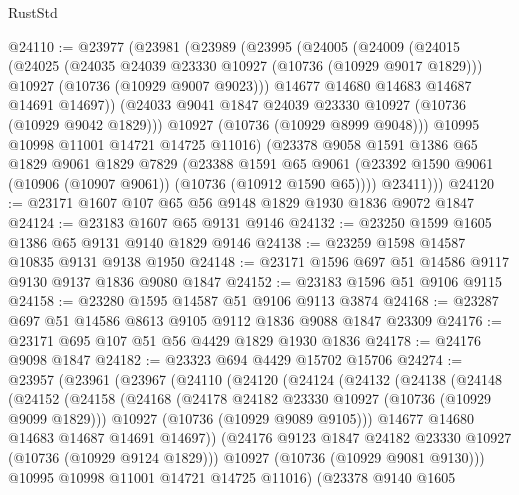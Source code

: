 \begin{lexlean}{RustStd}
\begin{coremodule}
@24110 := @23977
    (@23981
      (@23989
        (@23995
          (@24005
            (@24009
              (@24015
                (@24025
                  (@24035 @24039 @23330 @10927 (@10736 (@10929 @9017 @1829)))
                  @10927
                  (@10736 (@10929 @9007 @9023)))
                @14677
                @14680
                @14683
                @14687
                @14691
                @14697))
            (@24033 @9041 @1847 @24039 @23330 @10927 (@10736 (@10929 @9042 @1829)))
            @10927
            (@10736 (@10929 @8999 @9048)))
          @10995
          @10998
          @11001
          @14721
          @14725
          @11016)
        (@23378
          @9058
          @1591
          @1386
          @65
          @1829
          @9061
          @1829
          @7829
          (@23388
            @1591
            @65
            @9061
            (@23392 @1590 @9061 (@10906 (@10907 @9061)) (@10736 (@10912 @1590 @65))))
          @23411)))
@24120 := @23171 @1607 @107 @65 @56 @9148 @1829 @1930 @1836 @9072 @1847
@24124 := @23183 @1607 @65 @9131 @9146
@24132 := @23250 @1599 @1605 @1386 @65 @9131 @9140 @1829 @9146
@24138 := @23259 @1598 @14587 @10835 @9131 @9138 @1950
@24148 := @23171 @1596 @697 @51 @14586 @9117 @9130 @9137 @1836 @9080 @1847
@24152 := @23183 @1596 @51 @9106 @9115
@24158 := @23280 @1595 @14587 @51 @9106 @9113 @3874
@24168 := @23287 @697 @51 @14586 @8613 @9105 @9112 @1836 @9088 @1847 @23309
@24176 := @23171 @695 @107 @51 @56 @4429 @1829 @1930 @1836
@24178 := @24176 @9098 @1847
@24182 := @23323 @694 @4429 @15702 @15706
@24274 := @23957
    (@23961
      (@23967
        (@24110
          (@24120
            (@24124
              (@24132
                (@24138
                  (@24148
                    (@24152
                      (@24158
                        (@24168
                          (@24178 @24182 @23330 @10927 (@10736 (@10929 @9099 @1829)))
                          @10927
                          (@10736 (@10929 @9089 @9105)))
                        @14677
                        @14680
                        @14683
                        @14687
                        @14691
                        @14697))
                    (@24176 @9123 @1847 @24182 @23330 @10927 (@10736 (@10929 @9124 @1829)))
                    @10927
                    (@10736 (@10929 @9081 @9130)))
                  @10995
                  @10998
                  @11001
                  @14721
                  @14725
                  @11016)
                (@23378
                  @9140
                  @1605

\end{coremodule}
\end{lexlean}
